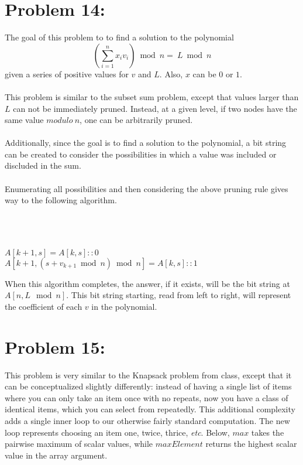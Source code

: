 \documentclass[12pt]{article}
\begin{document}
\section*{Problem 14: }
The goal of this problem to to find a 
solution to the polynomial \[\left(\sum_{i=1}^{n}x_iv_i\right)\bmod n=\ L\bmod n\]
given a series of positive values for $v$ and $L$.  Also, $x$
can be $0$ or $1$.\\\\  
This problem is similar to the subset sum problem, except that
values larger than $L$ can not be immediately pruned.
Instead, at a given level, if two nodes have the same value 
$modulo\ n$, one can be arbitrarily pruned.\\\\
Additionally, since the goal is to find a solution to the
polynomial, a bit string can be created to consider the
possibilities in which a value was included or discluded in
the sum.\\\\
Enumerating all possibilities and then considering the 
above pruning rule gives way to the following algorithm.\\\\
\begin{algorithm}[H]
\\
\\
{
{
{
   $A[k+1,s] = A[k,s]::0$\\
   $A[k+1, (s + v_{k+1}\bmod n)\bmod n] = A[k,s]::1$\\
}
}
}
\end{algorithm}
When this algorithm completes, the answer, if it exists,
will be the bit string at $A[n,L\mod n]$.  This bit string
starting, read from left to right, will represent the 
coefficient of each $v$ in the polynomial.

\section*{Problem 15: }
This problem is very similar to the Knapsack problem from class, except that it can be conceptualized slightly differently: instead of having a single list of items where you can only take an item once with no repeats, now you have a class of identical items, which you can select from repeatedly. This additional complexity adds a single inner loop to our otherwise fairly standard computation. The new loop represents choosing an item one, twice, thrice, \textit{etc}. Below, $max$ takes the pairwise maximum of scalar values, while $maxElement$ returns the highest scalar value in the array argument. 
\end{document}
